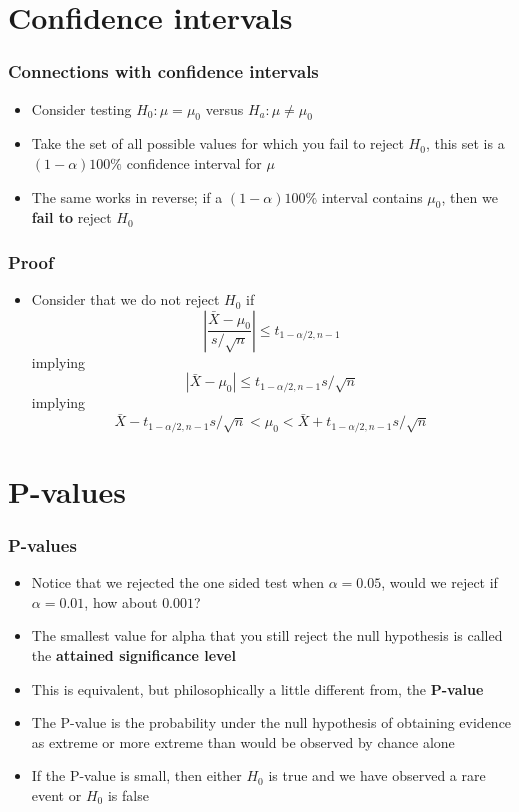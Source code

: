 \documentclass[aspectratio=169]{beamer}
\begin{document}
\section{Confidence intervals}
\begin{frame}\frametitle{Connections with confidence intervals}
\begin{itemize}
\item Consider testing $H_0: \mu = \mu_0$ versus $H_a: \mu \neq \mu_0$
\item Take the set of all possible values for which you fail to reject $H_0$, this
  set is a $(1-\alpha)100\%$ confidence interval for $\mu$
\item The same works in reverse; if a $(1-\alpha)100\%$ interval
  contains $\mu_0$, then we {\bf fail  to} reject $H_0$
\end{itemize}
\end{frame}

\begin{frame}\frametitle{Proof}
\begin{itemize}
\item Consider that we do not reject $H_0$ if
  $$\left| \frac{\bar X - \mu_0}{s /\sqrt{n}} \right| \leq t_{1-\alpha/2, n-1}$$
implying
  $$
  \left|\bar X - \mu_0 \right| \leq t_{1-\alpha/2, n-1} s /\sqrt{n}
  $$
implying
  $$
  \bar X - t_{1-\alpha/2, n-1} s /\sqrt{n} < \mu_0 
  < \bar X + t_{1-\alpha/2, n-1} s /\sqrt{n} 
  $$
\end{itemize}
\end{frame}

\section{P-values}
\begin{frame}\frametitle{P-values}
\begin{itemize}
\item Notice that we rejected the one sided test when $\alpha = 0.05$, would we reject
  if $\alpha = 0.01$, how about $0.001$?
\item The smallest value for alpha that you still reject the null hypothesis is called the {\bf attained significance level}
\item This is equivalent, but philosophically a little different from, the {\bf P-value}
\item The P-value is the probability under the null hypothesis of
  obtaining evidence as extreme or more extreme than would be observed
  by chance alone
\item If the P-value is small, then either $H_0$ is true and we have
  observed a rare event or $H_0$ is false
\end{itemize}
\end{frame} 
\end{document}
